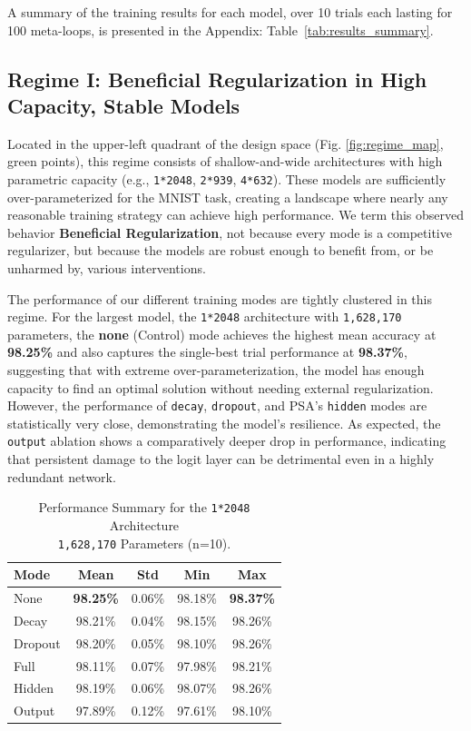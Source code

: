 \documentclass[conference]{IEEEtran}
\begin{document}
A summary of the training results for each model, over 10 trials each lasting for 100 meta-loops, is presented in the Appendix: Table~\ref{tab:results_summary}.

\subsection{Regime I: Beneficial Regularization in High Capacity, Stable Models}


Located in the upper-left quadrant of the design space (Fig. \ref{fig:regime_map}, green points), this regime consists of shallow-and-wide architectures with high parametric capacity (e.g., \texttt{1*2048}, \texttt{2*939}, \texttt{4*632}). These models are sufficiently over-parameterized for the MNIST task, creating a landscape where nearly any reasonable training strategy can achieve high performance. We term this observed behavior \textbf{Beneficial Regularization}, not because every mode is a competitive regularizer, but because the models are robust enough to benefit from, or be unharmed by, various interventions.

The performance of our different training modes are tightly clustered in this regime. For the largest model, the \texttt{1*2048} architecture with \texttt{1,628,170} parameters, the \textbf{none} (Control) mode achieves the highest mean accuracy at \textbf{98.25\%} and also captures the single-best trial performance at \textbf{98.37\%}, suggesting that with extreme over-parameterization, the model has enough capacity to find an optimal solution without needing external regularization. However, the performance of \verb|decay|, \verb|dropout|, and PSA's \verb|hidden| modes are statistically very close, demonstrating the model's resilience. As expected, the \verb|output| ablation shows a comparatively deeper drop in performance, indicating that persistent damage to the logit layer can be detrimental even in a highly redundant network.

\begin{table}[h!]
\centering
\caption{Performance Summary for the \texttt{1*2048} Architecture\\ \texttt{1,628,170} Parameters (n=10).}
\label{tab:1x2048_results}
\begin{tabular}{lcccc}
\toprule
\textbf{Mode} & \textbf{Mean} & \textbf{Std} & \textbf{Min} & \textbf{Max} \\
\midrule
None & \textbf{98.25\%} & 0.06\% & 98.18\% & \textbf{98.37\%} \\
Decay & 98.21\% & 0.04\% & 98.15\% & 98.26\% \\
Dropout & 98.20\% & 0.05\% & 98.10\% & 98.26\% \\
Full & 98.11\% & 0.07\% & 97.98\% & 98.21\% \\
Hidden & 98.19\% & 0.06\% & 98.07\% & 98.26\% \\
Output & 97.89\% & 0.12\% & 97.61\% & 98.10\% \\
\bottomrule
\end{tabular}
\end{table}
\end{document}

